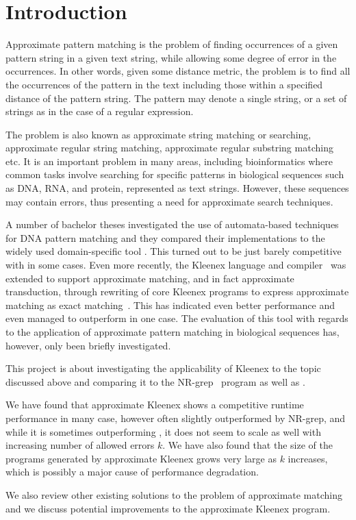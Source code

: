 \section{Introduction}

Approximate pattern matching is the problem of finding occurrences of a given
pattern string in a given text string, while allowing some degree of error in
the occurrences. In other words, given some distance metric, the problem is to
find all the occurrences of the pattern in the text including those within a
specified distance of the pattern string. The pattern may denote a single
string, or a set of strings as in the case of a regular expression.

The problem is also known as approximate string matching or searching,
approximate regular string matching, approximate regular substring matching
etc. It is an important problem in many areas, including bioinformatics where
common tasks involve searching for specific patterns in biological sequences
such as DNA, RNA, and protein, represented as text strings. However, these
sequences may contain errors, thus presenting a need for approximate search
techniques.

A number of bachelor theses investigated the use of automata-based techniques
for DNA pattern matching and they compared their implementations to the widely
used domain-specific tool \sfm{}.  This turned out to be just barely
competitive with \sfm{} in some cases. Even more recently, the Kleenex language
and compiler~\cite{grathwohl2016kleenex,soholm2015ordered} was extended to
support approximate matching, and in fact approximate transduction, through
rewriting of core Kleenex programs to express approximate matching as exact
matching~\cite{troelsen2016approximate}. This has indicated even better
performance and even managed to outperform \sfm{} in one case. The evaluation
of this tool with regards to the application of approximate pattern matching in
biological sequences has, however, only been briefly investigated.

This project is about investigating the applicability of Kleenex to the topic
discussed above and comparing it to the NR-grep~\cite{navarro2001nr} program as
well as \sfm{}.

We have found that approximate Kleenex shows a competitive runtime performance
in many case, however often slightly outperformed by NR-grep, and while it is
sometimes outperforming \sfm{}, it does not seem to scale as well with
increasing number of allowed errors $k$. We have also found that the size of
the programs generated by approximate Kleenex grows very large as $k$
increases, which is possibly a major cause of performance degradation.

We also review other existing solutions to the problem of approximate matching
and we discuss potential improvements to the approximate Kleenex program.

